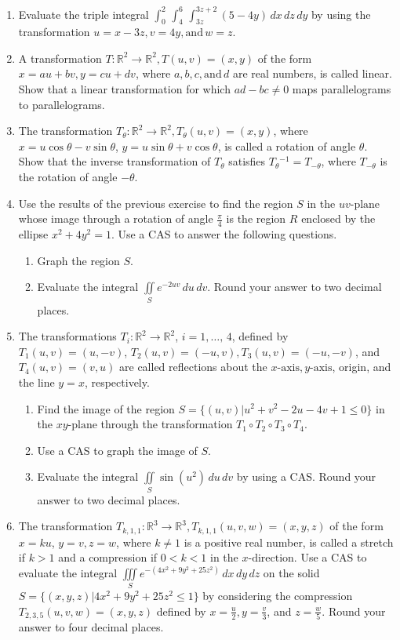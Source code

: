 \documentclass{exercises}
\begin{document}
\begin{enumerate}[resume]
\item Evaluate the triple integral $\int_{0}^{2}\,\int_{4}^{6}\,\int_{3z}^{3z+2}(5-4y)\,dx\,dz\,dy$ by using the transformation $u=x-3z,v=4y,\text{and}\,w=z$.
\item A transformation $T:\mathbb{R}^{2}\to \mathbb{R}^{2},T(u,v)=(x,y)$ of the form $x=au+bv,y=cu+dv$, where $a,b,c,\text{and}\,d$ are real numbers, is called linear. Show that a linear transformation for which $ad-bc\ne0$ maps parallelograms to parallelograms.
\item The transformation $T_{\theta}:\mathbb{R}^{2}\to \mathbb{R}^{2},T_{\theta}(u,v)=(x,y)$, where $x=u\cos \theta-v\sin \theta$, $y=u\sin \theta+v\cos \theta$, is called a rotation of angle $\theta$. Show that the inverse transformation of $T_{\theta}$ satisfies $T_{\theta}{}^{-1}=T_{-\theta}$, where $T_{-\theta}$ is the rotation of angle $-\theta$.
\item \techrequired Use the results of the previous exercise to find the region $S$ in the $uv\text{-plane}$ whose image through a rotation of angle $\frac{\pi}{4}$ is the region $R$ enclosed by the ellipse $x^{2}+4y^{2}=1$. Use a CAS to answer the following questions.
\begin{enumerate}[label=(\alph*)]
  \item Graph the region $S$.
  \item Evaluate the integral $\underset{S}{\iint}e^{-2uv}\,du\,dv$. Round your answer to two decimal places.
\end{enumerate}
\item \techrequired The transformations $T_{i}:\mathbb{R}^{2}\to \mathbb{R}^{2}$, $i=1,\ldots,\,4$, defined by $T_{1}(u,v)=(u,-v)$, $T_{2}(u,v)=(-u,v),T_{3}(u,v)=(-u,-v)$, and $T_{4}(u,v)=(v,u)$ are called reflections about the $x\text{-axis},y\text{-axis}$, origin, and the line $y=x$, respectively.
\begin{enumerate}[label=(\alph*)]
  \item Find the image of the region $S=\{(u,v)|u^{2}+v^{2}-2u-4v+1\le0\}$ in the $xy\text{-plane}$ through the transformation $T_{1}\circ T_{2}\circ T_{3}\circ T_{4}$.
  \item Use a CAS to graph the image of $S$.
  \item Evaluate the integral $\underset{S}{\iint}\sin(u^{2})\,du\,dv$ by using a CAS. Round your answer to two decimal places.
\end{enumerate}
\item \techrequired The transformation $T_{k,1,1}:\mathbb{R}^{3}\to \mathbb{R}^{3},T_{k,1,1}(u,v,w)=(x,y,z)$ of the form $x=ku$, $y=v,z=w$, where $k\ne1$ is a positive real number, is called a stretch if $k>1$ and a compression if $0<k<1$ in the $x\text{-direction}$. Use a CAS to evaluate the integral $\underset{S}{\iiint}e^{-(4x^{2}+9y^{2}+25z^{2})}\,dx\,dy\,dz$ on the solid $S=\{(x,y,z)|4x^{2}+9y^{2}+25z^{2}\le1\}$ by considering the compression $T_{2,3,5}(u,v,w)=(x,y,z)$ defined by $x=\frac{u}{2},y=\frac{v}{3}$, and $z=\frac{w}{5}$. Round your answer to four decimal places.

\end{enumerate}
\end{document}
